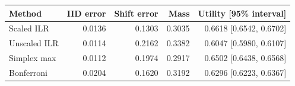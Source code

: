 \begin{tabular}{lrrrr}
\toprule
Method & IID error & Shift error & Mass & Utility [95\% interval] \\
\midrule
Scaled ILR & 0.0136 & 0.1303 & 0.3035 & 0.6618 [0.6542, 0.6702] \\
Unscaled ILR & 0.0114 & 0.2162 & 0.3382 & 0.6047 [0.5980, 0.6107] \\
Simplex max & 0.0112 & 0.1974 & 0.2917 & 0.6502 [0.6438, 0.6568] \\
Bonferroni & 0.0204 & 0.1620 & 0.3192 & 0.6296 [0.6223, 0.6367] \\
\bottomrule
\end{tabular}
